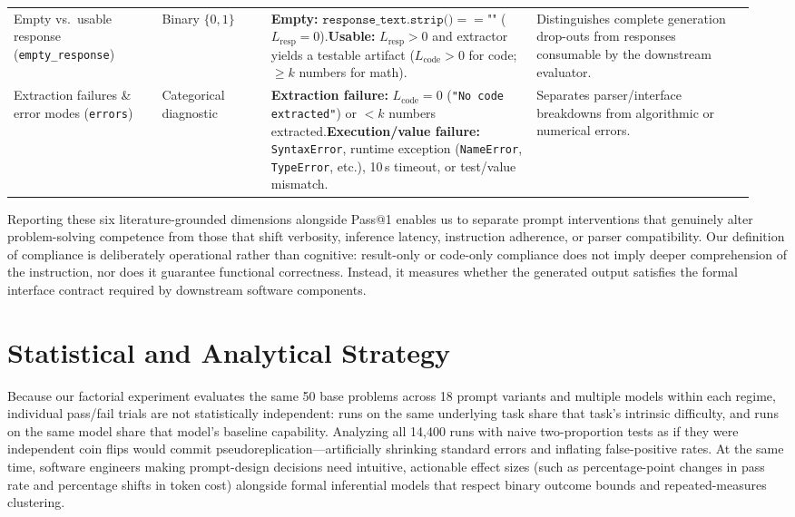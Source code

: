 \documentclass[a4paper,fleqn]{cas-sc}
\begin{document}
\begin{table}[htbp]
\begin{tabular}{@{}p{0.19\linewidth}p{0.14\linewidth}p{0.34\linewidth}p{0.28\linewidth}@{}}
\addlinespace[3pt]
Empty vs.\ usable response (\texttt{empty\_response}) & Binary $\{0, 1\}$ & \textbf{Empty:} $\texttt{response\_text.strip()} == \texttt{""}$ ($L_{\text{resp}} = 0$).\newline \textbf{Usable:} $L_{\text{resp}} > 0$ and extractor yields a testable artifact ($L_{\text{code}} > 0$ for code; $\ge k$ numbers for math). & Distinguishes complete generation drop-outs from responses consumable by the downstream evaluator. \\
\addlinespace[3pt]
Extraction failures \& error modes (\texttt{errors}) & Categorical diagnostic & \textbf{Extraction failure:} $L_{\text{code}} = 0$ (\texttt{"No code extracted"}) or $< k$ numbers extracted.\newline \textbf{Execution/value failure:} \texttt{SyntaxError}, runtime exception (\texttt{NameError}, \texttt{TypeError}, etc.), 10\,s timeout, or test/value mismatch. & Separates parser/interface breakdowns from algorithmic or numerical errors. \\
\bottomrule
\end{tabular}
\end{table}

Reporting these six literature-grounded dimensions alongside Pass@1 enables us to separate prompt interventions that genuinely alter problem-solving competence from those that shift verbosity, inference latency, instruction adherence, or parser compatibility. Our definition of compliance is deliberately operational rather than cognitive: result-only or code-only compliance does not imply deeper comprehension of the instruction, nor does it guarantee functional correctness. Instead, it measures whether the generated output satisfies the formal interface contract required by downstream software components.

\section{Statistical and Analytical Strategy}\label{statistical-and-analytical-strategy}

Because our factorial experiment evaluates the same 50 base problems across 18 prompt variants and multiple models within each regime, individual pass/fail trials are not statistically independent: runs on the same underlying task share that task's intrinsic difficulty, and runs on the same model share that model's baseline capability. Analyzing all 14,400 runs with naive two-proportion tests as if they were independent coin flips would commit pseudoreplication—artificially shrinking standard errors and inflating false-positive rates. At the same time, software engineers making prompt-design decisions need intuitive, actionable effect sizes (such as percentage-point changes in pass rate and percentage shifts in token cost) alongside formal inferential models that respect binary outcome bounds and repeated-measures clustering.
\end{document}
